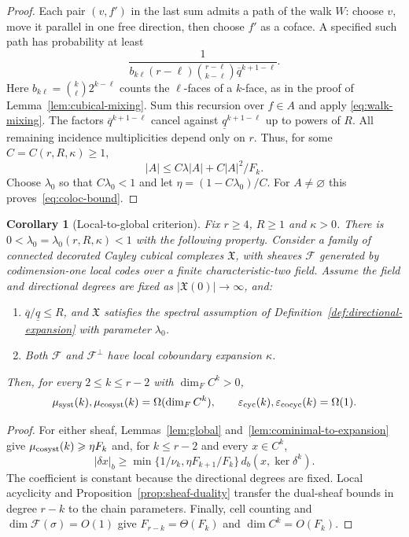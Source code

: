 \documentclass[11pt,letterpaper]{article}
\renewcommand{\le}{\leqslant}
\renewcommand{\ge}{\geqslant}
\newtheorem{corollary}[theorem]{Corollary}
\theoremstyle{definition}
\theoremstyle{remark}
\newcommand{\cF}{\mathcal F}
\newcommand{\X}{\mathfrak{X}}
\newcommand{\db}{d_b}
\newcommand{\eps}{\varepsilon}
\begin{document}
\begin{proof}
Each pair $(v,f')$ in the last sum admits a path of the walk $W$:
choose $v$, move it parallel in one free direction, then choose
$f'$ as a coface. A specified such path has probability at least
\[
 \frac1{b_{k\ell}(r-\ell)\binom{r-\ell}{k-\ell}
 \overline q^{k+1-\ell}}.
\]
Here $b_{k\ell}=\binom k\ell2^{k-\ell}$ counts the $\ell$-faces of
a $k$-face, as in the proof of Lemma~\ref{lem:cubical-mixing}.
Sum this recursion over $f\in A$ and apply
\eqref{eq:walk-mixing}. The factors $\overline q^{k+1-\ell}$ cancel
against $\underline q^{k+1-\ell}$ up to powers of $R$.
All remaining incidence multiplicities depend only on $r$.
Thus, for some $C=C(r,R,\kappa)\ge1$,
\begin{equation*}
 |A|\le C\lambda|A|+C|A|^2/F_k.
\end{equation*}
Choose $\lambda_0$ so that $C\lambda_0<1$ and let
$\eta=(1-C\lambda_0)/C$.
For $A\ne\varnothing$ this proves~\eqref{eq:coloc-bound}.
\end{proof}

\begin{corollary}[Local-to-global criterion]\label{thm:sheaf-criterion}
Fix $r\ge4$, $R\ge1$ and $\kappa>0$. There is
$0<\lambda_0=\lambda_0(r,R,\kappa)<1$ with the following property.
Consider a family of connected decorated Cayley cubical complexes
$\X$, with sheaves $\cF$ generated by codimension-one local codes over a finite
characteristic-two field. Assume the field and directional degrees
are fixed as $|\X(0)|\to\infty$, and:
\begin{enumerate}[label=(\roman*),leftmargin=*]
\item $\overline q/\underline q\le R$, and $\X$ satisfies the spectral assumption of
Definition~\ref{def:directional-expansion} with parameter $\lambda_0$.
\item Both $\cF$ and $\cF^\perp$ have local coboundary expansion $\kappa$.
\end{enumerate}
Then, for every $2\le k\le r-2$ with $\dim_F C^k>0$,
\begin{equation}
 \mu_{\rm syst}(k),\mu_{\rm cosyst}(k)=\Omega(\dim_F C^k),\qquad
 \eps_{\rm cyc}(k),\eps_{\rm cocyc}(k)=\Omega(1).
 \label{eq:global-expansion}
\end{equation}
\end{corollary}
\begin{proof}
For either sheaf, Lemmas~\ref{lem:global}
and~\ref{lem:cominimal-to-expansion} give
$\mu_{\rm cosyst}(k)\ge\eta F_k$ and, for $k\le r-2$ and every $x\in C^k$,
\begin{equation}
 |\delta x|_b\ge
 \min\{1/\nu_k,\eta F_{k+1}/F_k\}\,
 \db(x,\ker\delta^k).
 \label{eq:all-word-global}
\end{equation}
The coefficient is constant because the directional degrees are fixed.
Local acyclicity and Proposition~\ref{prop:sheaf-duality} transfer the
dual-sheaf bounds in degree $r-k$ to the chain parameters.
Finally, cell counting and $\dim\cF(\sigma)=O(1)$ give
$F_{r-k}=\Theta(F_k)$ and $\dim C^k=O(F_k)$.
\end{proof}
\end{document}
